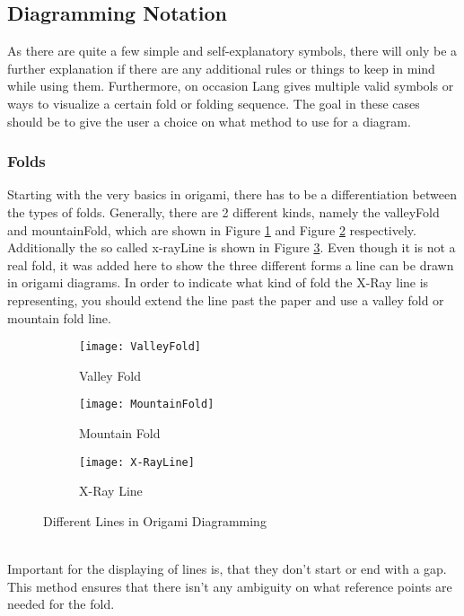 \newpage
\subsection{Diagramming Notation}
\label{sec:notation}

As there are quite a few simple and self-explanatory symbols, there will only be a further explanation if there are any additional rules or things to keep in mind while using them. Furthermore, on occasion Lang gives multiple valid symbols or ways to visualize a certain fold or folding sequence. The goal in these cases should be to give the user a choice on what method to use for a diagram. 

\subsubsection{Folds}
\label{sec:folds}

Starting with the very basics in origami, there has to be a differentiation between the types of folds. Generally, there are 2 different kinds, namely the \gls{valleyFold} and \gls{mountainFold}, which are shown in Figure \ref{fig:valleyFold} and Figure \ref{fig:mountainFold} respectively. Additionally the so called \gls{x-rayLine} is shown in Figure \ref{fig:x-rayLine}. Even though it is not a real fold, it was added here to show the three different forms a line can be drawn in origami diagrams. In order to indicate what kind of fold the X-Ray line is representing, you should extend the line past the paper and use a valley fold or mountain fold line.
\begin{figure*}[h]
    \centering
    \begin{subfigure}[b]{0.3\textwidth}
        \texttt{[image: ValleyFold]}
        \caption{Valley Fold}
        \label{fig:valleyFold}
    \end{subfigure}
    \begin{subfigure}[b]{0.3\textwidth}
        \texttt{[image: MountainFold]}
        \caption{Mountain Fold}
        \label{fig:mountainFold}
    \end{subfigure}
    \begin{subfigure}[b]{0.3\textwidth}
        \texttt{[image: X-RayLine]}
        \caption{X-Ray Line}
        \label{fig:x-rayLine}
    \end{subfigure}
    \caption{Different Lines in Origami Diagramming}\label{fig:origamiLines}
\end{figure*}
\\
Important for the displaying of lines is, that they don't start or end with a gap. This method ensures that there isn't any ambiguity on what reference points are needed for the fold.

